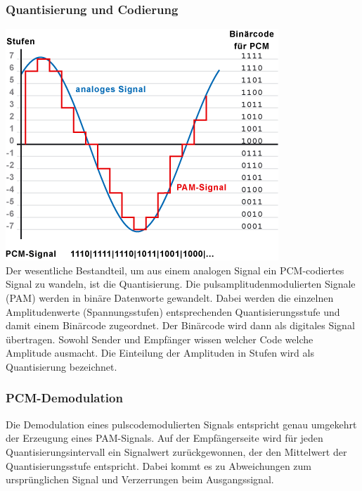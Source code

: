 \documentclass[a4paper,10pt]{article}
\begin{document}
\subsubsection{Quantisierung und Codierung}
\includegraphics[scale=0.7]{Quantisierung.png}\\
Der wesentliche Bestandteil, um aus einem analogen Signal ein PCM-codiertes Signal zu wandeln, ist die Quantisierung. 
Die pulsamplitudenmodulierten Signale (PAM) werden in binäre Datenworte gewandelt. Dabei werden die einzelnen Amplitudenwerte 
(Spannungsstufen) entsprechenden Quantisierungsstufe und damit einem Binärcode zugeordnet. Der Binärcode wird dann als digitales 
Signal übertragen. Sowohl Sender und Empfänger wissen welcher Code welche Amplitude ausmacht.
Die Einteilung der Amplituden in Stufen wird als Quantisierung bezeichnet.

\subsubsection{PCM-Demodulation}
Die Demodulation eines pulscodemodulierten Signals entspricht genau umgekehrt der Erzeugung eines PAM-Signals.
Auf der Empfängerseite wird für jeden Quantisierungsintervall ein Signalwert zurückgewonnen, der den Mittelwert 
der Quantisierungsstufe entspricht. Dabei kommt es zu Abweichungen zum ursprünglichen Signal und Verzerrungen beim Ausgangssignal.
\end{document}
